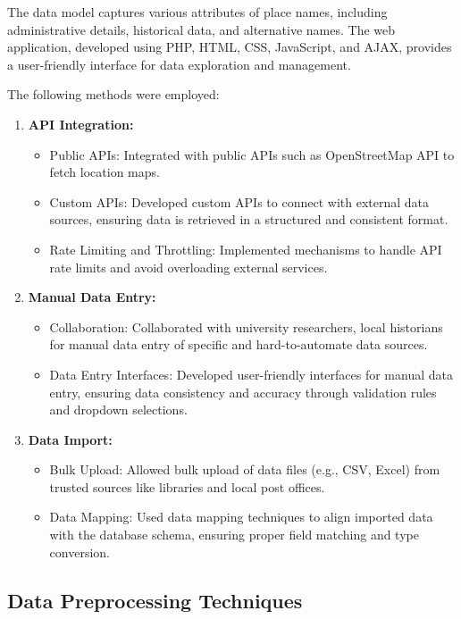 The data model captures various attributes of place names, including administrative details, historical data, and alternative names. The web application, developed using PHP, HTML, CSS, JavaScript, and AJAX, provides a user-friendly interface for data exploration and management.

The following methods were employed:

\begin{enumerate}
    \item \textbf{API Integration:}
    \begin{itemize}
        \item Public APIs: Integrated with public APIs such as OpenStreetMap API to fetch location maps.
        \item Custom APIs: Developed custom APIs to connect with external data sources, ensuring data is retrieved in a structured and consistent format.
        \item Rate Limiting and Throttling: Implemented mechanisms to handle API rate limits and avoid overloading external services.
    \end{itemize}
    
    \item \textbf{Manual Data Entry:}
    \begin{itemize}
        \item Collaboration: Collaborated with university researchers, local historians for manual data entry of specific and hard-to-automate data sources.
        \item Data Entry Interfaces: Developed user-friendly interfaces for manual data entry, ensuring data consistency and accuracy through validation rules and dropdown selections.
    \end{itemize}
    
    \item \textbf{Data Import:}
    \begin{itemize}
        \item Bulk Upload: Allowed bulk upload of data files (e.g., CSV, Excel) from trusted sources like libraries and local post offices.
        \item Data Mapping: Used data mapping techniques to align imported data with the database schema, ensuring proper field matching and type conversion.
    \end{itemize}
\end{enumerate}

\subsection{Data Preprocessing Techniques}

